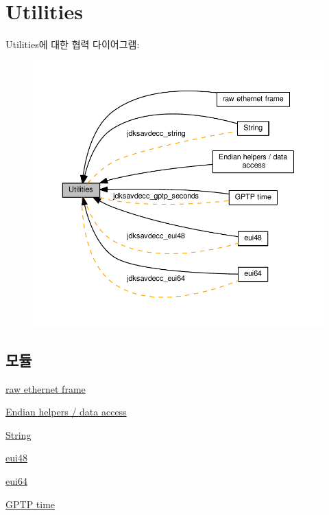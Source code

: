 \hypertarget{group__util}{}\section{Utilities}
\label{group__util}
Utilities에 대한 협력 다이어그램\+:
\nopagebreak
\begin{figure}[H]
\begin{center}
\leavevmode
\includegraphics[width=350pt]{group__util}
\end{center}
\end{figure}
\subsection*{모듈}
\begin{DoxyCompactItemize}
\item 
\hyperlink{group__frame}{raw ethernet frame}
\item 
\hyperlink{group__endian}{Endian helpers / data access}
\item 
\hyperlink{group__string}{String}
\item 
\hyperlink{group__eui48}{eui48}
\item 
\hyperlink{group__eui64}{eui64}
\item 
\hyperlink{group__gptp}{G\+P\+T\+P time}
\end{DoxyCompactItemize}
